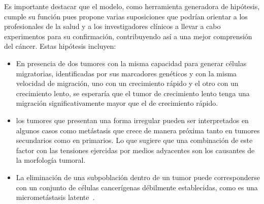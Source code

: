 \begin{conclusions}
Es importante destacar que el modelo, como herramienta generadora de hipótesis, cumple su función pues propone varias suposiciones que podrían orientar a los profesionales de la salud y a los investigadores clínicos a llevar a cabo experimentos para su confirmación, contribuyendo así a una mejor comprensión del cáncer. Estas hipótesis incluyen:

\begin{itemize}
    \item En presencia de dos tumores con la misma capacidad para generar células migratorias, identificadas por sus marcadores genéticos y con la misma velocidad de migración, uno con un crecimiento rápido y el otro con un crecimiento lento, se esperaría que el tumor de crecimiento lento tenga una migración significativamente mayor que el de crecimiento rápido.
    \item los tumores que presentan una forma irregular pueden ser interpretados en algunos casos como metástasis que crece de manera próxima tanto en tumores secundarios como en primarios. Lo que sugiere que una combinación de este factor con las tensiones ejercidas por medios adyacentes son los causantes de la morfología tumoral.
    \item La eliminación de una subpoblación dentro de un tumor puede corresponderse con un conjunto de células cancerígenas débilmente establecidas, como es una micrometástasis latente~\cite{robins}.
\end{itemize}

\end{conclusions}
